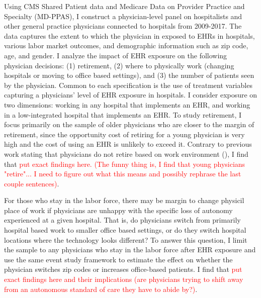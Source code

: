 \documentclass[11pt]{article}
\begin{document}
Using CMS Shared Patient data and Medicare Data on Provider Practice and Specialty (MD-PPAS), I construct a physician-level panel on hospitalists and other general practice physicians connected to hospitals from 2009-2017. The data captures the extent to which the physician in exposed to EHRs in hospitals, various labor market outcomes, and demographic information such as zip code, age, and gender. I analyze the impact of EHR exposure on the following physician decisions: (1) retirement, (2) where to physically work (changing hospitals or moving to office based settings), and (3) the number of patients seen by the physician. Common to each specification is the use of treatment variables capturing a physicians' level of EHR exposure in hospitals. I consider exposure on two dimensions: working in any hospital that implements an EHR, and working in a low-integrated hospital that implements an EHR.  To study retirement, I focus primarily on the sample of older physicians who are closer to the margin of retirement, since the opportunity cost of retiring for a young physician is very high and the cost of using an EHR is unlikely to exceed it. Contrary to previous work stating that physicians do not retire based on work environment (\cite{Bahrami2002}), I find that \textcolor{red}{put exact findings here. (The funny thing is, I find that young physicians "retire"... I need to figure out what this means and possibly rephrase the last couple sentences)}.

For those who stay in the labor force, there may be margin to change physicil place of work if physicians are unhappy with the specific loss of autonomy experienced at a given hospital. That is, do physicians switch from primarily hospital based work to smaller office based settings, or do they switch hospital locations where the technology looks different? To answer this question, I limit the sample to any physicians who stay in the labor force after EHR exposure and use the same event study framework to estimate the effect on whether the physician switches zip codes or increases office-based patients. I find that \textcolor{red}{put exact findings here and their implications (are physicians trying to shift away from an autonomous standard of care they have to abide by?)}. 
\end{document}

